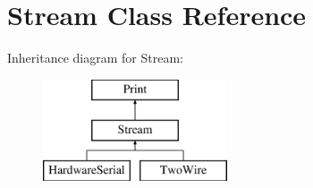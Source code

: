 \hypertarget{class_stream}{}\section{Stream Class Reference}
\label{class_stream}
Inheritance diagram for Stream\+:\begin{figure}[H]
\begin{center}
\leavevmode
\includegraphics[height=3.000000cm]{class_stream}
\end{center}
\end{figure}

